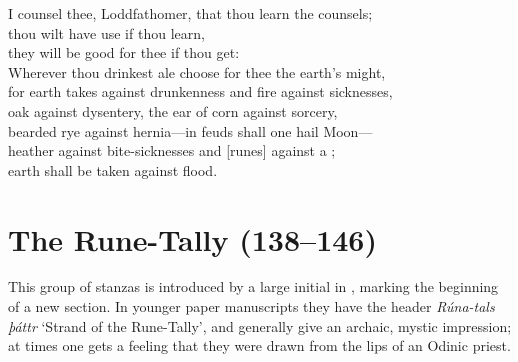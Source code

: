 \bvg\bva{}%
\eva

\bvb I counsel thee, Loddfathomer, that thou learn the counsels; \\
\ind thou wilt have use if thou learn, \\
\ind they will be good for thee if thou get: \\
Wherever thou drinkest ale choose for thee the earth’s might, \\
for earth takes against drunkenness and fire against sicknesses, \\
oak against dysentery, the ear of corn against sorcery, \\
bearded rye against hernia—in feuds shall one hail Moon— \\
heather against bite-sicknesses and [runes] against a ; \\
\ind earth shall be taken against flood.\evb\evg

\sectionline

\section{The Rune-Tally (138–146)}

This group of stanzas is introduced by a large initial in \Regius, marking the beginning of a new section.  In younger paper manuscripts they have the header \emph{Rúna-tals þáttr} ‘Strand of the Rune-Tally’, and generally give an archaic, mystic impression; at times one gets a feeling that they were drawn from the lips of an Odinic priest.

